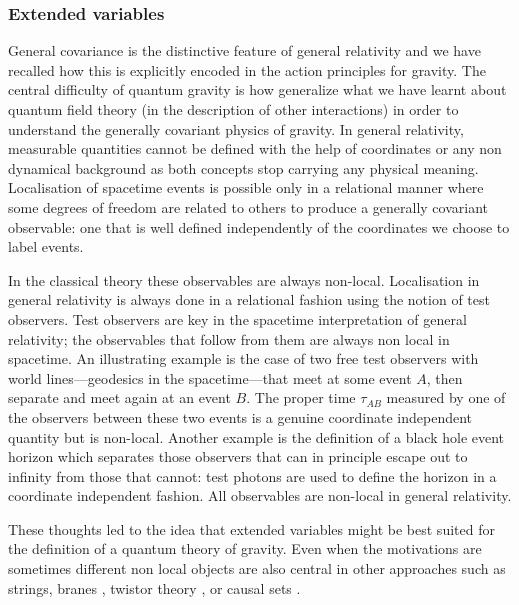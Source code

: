 \documentclass[aps, nofootinbib,superscriptaddress,12pt]{revtex4-2}
\begin{document}
\subsubsection{Extended variables}\label{ev}

General covariance is the distinctive feature of general relativity and we have recalled how this is explicitly encoded in the action principles for gravity. The central difficulty of quantum gravity is how generalize what we have learnt about quantum field theory (in the description of other interactions) in order to understand the generally covariant physics of gravity. In general relativity, measurable quantities cannot be defined with the help of coordinates or any non dynamical background  as both concepts stop carrying any physical meaning. Localisation of spacetime events is possible only in a relational manner where some degrees of freedom are related to others to produce a generally covariant observable: one that is well defined independently of the coordinates we choose to label events. 

In the classical theory these observables are always non-local. Localisation in general relativity is always done in a relational fashion using the notion of test observers. Test observers are key in the spacetime interpretation of general relativity; the observables that follow from them are always non local in spacetime. An illustrating example is the case of two free test observers with world lines---geodesics in the spacetime---that meet at some event $A$, then separate and meet again at an event $B$. The proper time $\tau_{AB}$ measured by one of the observers between these two events  is a genuine coordinate independent quantity but is non-local. Another example is the definition of a black hole event horizon which separates those observers that can in principle escape out to infinity from those that cannot: test photons are used to define the horizon in a coordinate independent fashion. All observables are non-local in general relativity.

These thoughts led to the idea that extended variables might be best suited for the definition of a 
quantum theory of gravity. Even when the motivations are sometimes different non local objects are also central in other approaches such as strings, branes \cite{Polchinski:1998rq}, twistor theory \cite{Penrose:1972ia}, or causal sets \cite{Bombelli:1987aa}.
 
\end{document}
